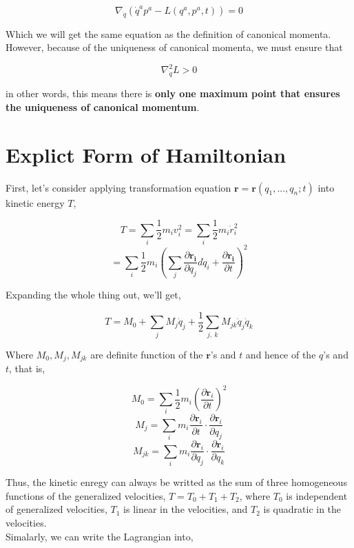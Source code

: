 \documentclass[12pt]{article}
\numberwithin{equation}{section}
\begin{document}
\begin{center}
    \[ \nabla_{\dot{q}} \left( \dot{q}^ap^a - L(q^a, p^a, t) \right) = 0 \]
\end{center}

Which we will get the same equation as the definition of canonical momenta. However, because of the uniqueness of canonical momenta, we must ensure that

\begin{center}
    \[ \nabla_{\dot{q}}^2 L > 0 \]
\end{center}

in other words, this means there is \textbf{only one maximum point that ensures the uniqueness of canonical momentum}.

\section{Explict Form of Hamiltonian}
First, let's consider applying transformation equation $\mathbf{r} = \mathbf{r}(q_1, ..., q_n; t)$ into kinetic energy $T$,

\begin{center}
    \[ T = \sum_i{\frac{1}{2}m_i v_{i}^2 = \sum_i{\frac{1}{2} m_i \dot{r}_{i}^2}} \]
    \[ = \sum_i{\frac{1}{2} m_i \left( \sum_j{ \frac{\partial \mathbf{r_i}}{\partial q_j}d\dot{q}_i + \frac{\partial \mathbf{r_i}}{\partial t} }\right)^2} \]
\end{center}

Expanding the whole thing out, we'll get,

\begin{center}
    \[ T = M_0 + \sum_{j}{M_j\dot{q}_j} + \frac{1}{2}\sum_{j,\ k}{M_{jk}\dot{q}_j\dot{q}_k} \]
\end{center}

Where $M_0, M_j, M_{jk}$ are definite function of the $\mathbf{r}$'s and $t$ and hence of the $q$'s and $t$, that is, 

\begin{center}
    \[ M_0 = \sum_{i}{\frac{1}{2}m_i\left(\frac{\partial \mathbf{r}_i}{\partial t}\right)^2} \]
    \[ M_j = \sum_{i}{m_i \frac{\partial \mathbf{r}_i}{\partial t} \cdot \frac{\partial \mathbf{r}_i}{\partial q_j}} \]
    \[ M_{jk} = \sum_{i}{m_i \frac{\partial \mathbf{r}_i}{\partial q_j} \cdot \frac{\partial \mathbf{r}_i}{\partial q_k}} \] 
\end{center}

Thus, the kinetic enregy can always be writted as the sum of three homogeneous functions of the generalized velocities, $T = T_0 + T_1 + T_2$, where $T_0$ is independent of generalized velocities, $T_1$ is linear in the velocities, and $T_2$ is quadratic in the velocities.
\\
Simalarly, we can write the Lagrangian into,
\end{document}
